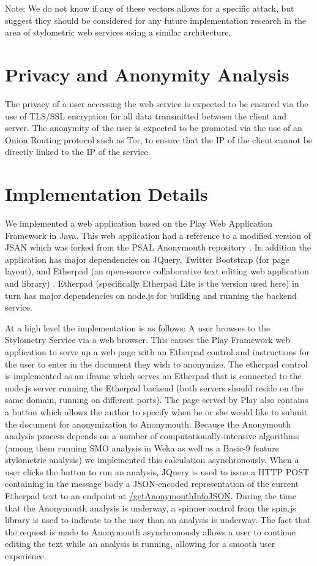 \documentclass[letterpaper]{article}
\begin{document}
Note: We do not know if any of these vectors allows for a specific
attack, but suggest they should be considered for any future
implementation research in the area of stylometric web services using
a similar architecture.

\section{Privacy and Anonymity Analysis}

The privacy of a user accessing the web service is expected to be
ensured via the use of TLS/SSL encryption for all data transmitted
between the client and server. The anonymity of the user is expected
to be promoted via the use of an Onion Routing protocol such as Tor,
to ensure that the IP of the client cannot be directly linked to the
IP of the service.

\section{Implementation Details}

We implemented a web application based on the Play Web Application
Framework in Java. This web application had a reference to a modified
version of JSAN which was forked from the PSAL Anonymouth repository
\cite{PSAL:github}. In addition the application has major dependencies
on JQuery, Twitter Bootstrap (for page layout), and Etherpad (an
open-source collaborative text editing web application and library)
\cite{etherpad}. Etherpad (specifically Etherpad Lite is the version
used here) in turn has major dependencies on node.js for building and
running the backend service.

At a high level the implementation is as follows: A user browses to
the Stylometry Service via a web browser. This causes the Play
Framework web application to serve up a web page with an Etherpad
control and instructions for the user to enter in the document they
wish to anonymize. The etherpad control is implemented as an iframe
which serves an Etherpad that is connected to the node.js server
running the Etherpad backend (both servers should reside on the same
domain, running on different ports). The page served by Play also
contains a button which allows the author to specify when he or she
would like to submit the document for anonymization to
Anonymouth. Because the Anonymouth analysis process depends on a
number of computationally-intensive algorithms (among them running SMO
analysis in Weka as well as a Basic-9 feature stylometric analysis) we
implemented this calculation asynchronously. When a user clicks the
button to run an analysis, JQuery is used to issue a HTTP POST
containing in the message body a JSON-encoded representation of the
current Etherpad text to an endpoint at
\url{/getAnonymouthInfoJSON}. During the time that the Anonymouth
analysis is underway, a spinner control from the spin.js library is
used to indicate to the user than an analysis is underway. The fact
that the request is made to Anonymouth asynchronously allows a user to
continue editing the text while an analysis is running, allowing for a
smooth user experience.
\end{document}
